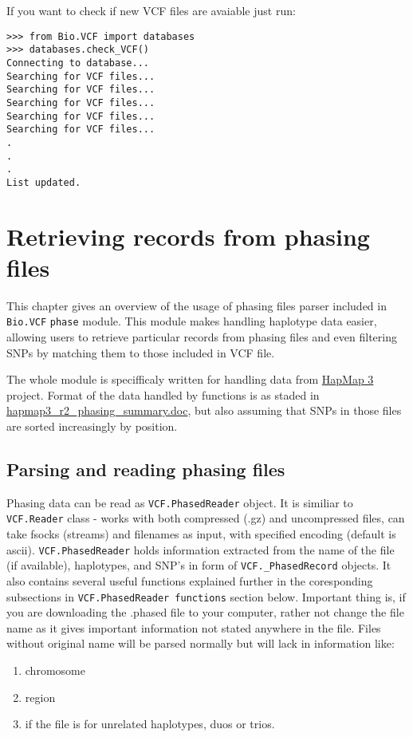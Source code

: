 \noindent If you want to check if new VCF files are avaiable just run:

\begin{verbatim}
>>> from Bio.VCF import databases
>>> databases.check_VCF()
Connecting to database...
Searching for VCF files...
Searching for VCF files...
Searching for VCF files...
Searching for VCF files...
Searching for VCF files...
.
.
.
List updated.
\end{verbatim}
    
    
\section {Retrieving records from phasing files}

This chapter gives an overview of the usage of phasing files parser included in \verb|Bio.VCF| \verb|phase| module.
This module makes handling haplotype data easier, allowing users to retrieve particular records from phasing files
and even filtering SNPs by matching them to those included in VCF file.

The whole module is specifficaly written for handling data from \href{ftp://ftp.hapmap.org/hapmap/phasing/2009-02\_phaseIII/HapMap3\_r2/}{HapMap 3} project.
Format of the data handled by functions is as staded in \href{ftp://ftp.hapmap.org/hapmap/phasing/2009-02\_phaseIII/HapMap3\_r2/hapmap3\_r2\_phasing\_summary.doc}{hapmap3\_r2\_phasing\_summary.doc},
but also assuming that SNPs in those files are sorted increasingly by position.


\subsection{Parsing and reading phasing files}

Phasing data can be read as \verb|VCF.PhasedReader| object. It is similiar to \verb|VCF.Reader| class - works with both compressed (.gz) and
uncompressed files, can take fsocks (streams) and filenames as input, with specified encoding (default is ascii).
\verb|VCF.PhasedReader| holds information extracted from the name of the file (if available), haplotypes, and SNP's in form of \verb|VCF._PhasedRecord| objects.
It also contains several useful functions explained further in the coresponding subsections in \verb|VCF.PhasedReader functions| section below.
Important thing is, if you are downloading the .phased file to your computer, rather not change the file name as it gives important
information not stated anywhere in the file. Files without original name will be parsed normally but will lack in information like:
\begin{enumerate}
  \item chromosome
  \item region
  \item if the file is for unrelated haplotypes, duos or trios.
\end{enumerate}

